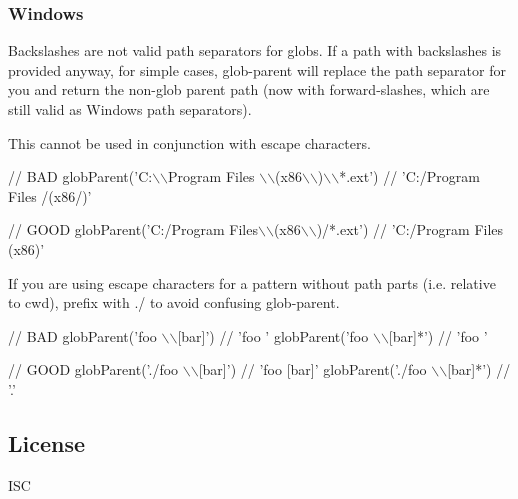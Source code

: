 \subsubsection*{Windows}

Backslashes are not valid path separators for globs. If a path with backslashes is provided anyway, for simple cases, glob-\/parent will replace the path separator for you and return the non-\/glob parent path (now with forward-\/slashes, which are still valid as Windows path separators).

This cannot be used in conjunction with escape characters.


\begin{DoxyCode}
// BAD
globParent('C:\(\backslash\)\(\backslash\)Program Files \(\backslash\)\(\backslash\)(x86\(\backslash\)\(\backslash\))\(\backslash\)\(\backslash\)*.ext') // 'C:/Program Files /(x86/)'

// GOOD
globParent('C:/Program Files\(\backslash\)\(\backslash\)(x86\(\backslash\)\(\backslash\))/*.ext') // 'C:/Program Files (x86)'
\end{DoxyCode}


If you are using escape characters for a pattern without path parts (i.\+e. relative to {\ttfamily cwd}), prefix with {\ttfamily ./} to avoid confusing glob-\/parent.


\begin{DoxyCode}
// BAD
globParent('foo \(\backslash\)\(\backslash\)[bar]') // 'foo '
globParent('foo \(\backslash\)\(\backslash\)[bar]*') // 'foo '

// GOOD
globParent('./foo \(\backslash\)\(\backslash\)[bar]') // 'foo [bar]'
globParent('./foo \(\backslash\)\(\backslash\)[bar]*') // '.'
\end{DoxyCode}


\subsection*{License}

I\+SC 